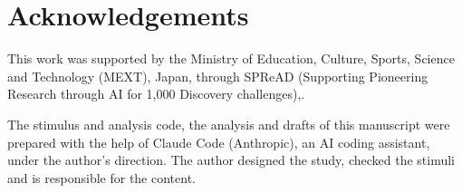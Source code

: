 \documentclass[11pt]{article}
\begin{document}
\section*{Acknowledgements}
This work was supported by the Ministry of Education, Culture, Sports, Science and Technology (MEXT), Japan, through
SPReAD (Supporting Pioneering Research through AI for 1,000 Discovery challenges),.

The stimulus and analysis code, the analysis and drafts of this manuscript were prepared with the help of Claude
Code (Anthropic), an AI coding assistant, under the author's direction. The author designed the study, checked the
stimuli and is responsible for the content.



\end{document}
